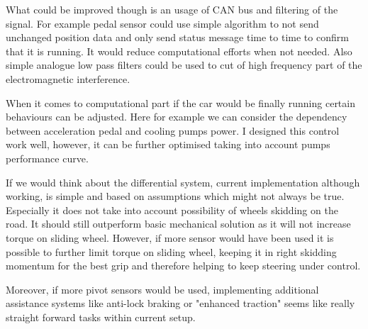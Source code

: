 What could be improved though is an usage of CAN bus and filtering of the signal. For example pedal sensor could use simple algorithm to not send unchanged position data and only send status message time to time to confirm that it is running. It would reduce computational efforts when not needed. 
Also simple analogue low pass filters could be used to cut of high frequency part of the electromagnetic interference.



When it comes to computational part if the car would be finally running certain behaviours can be adjusted. Here for example we can consider the dependency between acceleration pedal and cooling pumps power. I designed this control work well, however, it can be further optimised taking into account pumps performance curve.


If we would think about the differential system, current implementation although working, is simple and based on assumptions which might not always be true. Especially it does not take into account possibility of wheels skidding on the road. It should still outperform basic mechanical solution as it will not increase torque on sliding wheel. However, if more sensor would have been used it is possible to further limit torque on sliding wheel, keeping it in right skidding momentum for the best grip and therefore helping to keep steering under control.

Moreover, if more pivot sensors would be used, implementing additional assistance systems like anti-lock braking or "enhanced traction" seems like really straight forward tasks within current setup. 